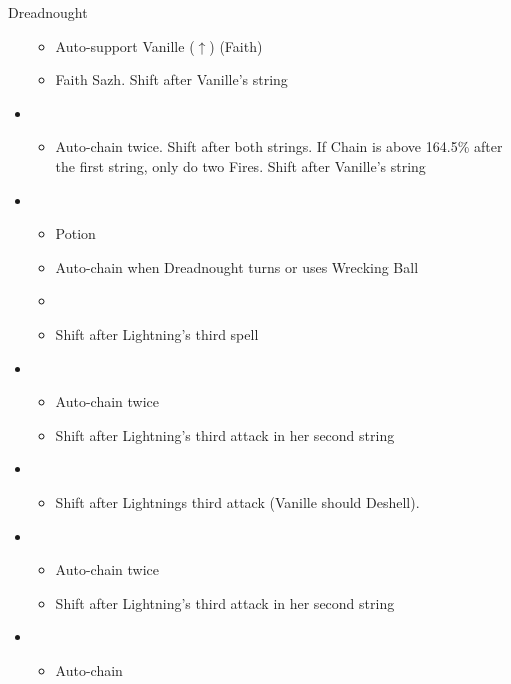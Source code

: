 \begin{battle}{Dreadnought}
\begin{multicols}{2}
\begin{itemize}
\begin{itemize}
        \item Auto-support Vanille ($\uparrow$) (Faith)
        \item Faith Sazh. Shift after Vanille's string
    \end{itemize}
    \item \fifth
    \begin{itemize}
        \item Auto-chain twice. Shift after both strings. If Chain is above 164.5\% after the first string, only do two Fires. Shift after Vanille's string
    \end{itemize}
    \item \fourth
    \begin{itemize}
        \item Potion
        \item Auto-chain when Dreadnought turns or uses Wrecking Ball
        \item \stagger
        \item Shift after Lightning's third spell
    \end{itemize}
    \item \first
    \begin{itemize}
        \item Auto-chain twice
        \item Shift after Lightning's third attack in her second string
    \end{itemize}
    \item \second
    \begin{itemize}
        \item Shift after Lightnings third attack (Vanille should Deshell).
    \end{itemize}
    \item \first
    \begin{itemize}
        \item Auto-chain twice
        \item Shift after Lightning's third attack in her second string
    \end{itemize}
    \item \third
    \begin{itemize}
        \item Auto-chain
    \end{itemize}
\end{itemize}
\end{multicols}
\end{battle}

